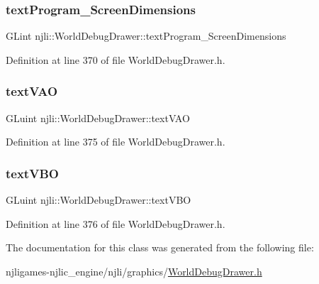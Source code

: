 \subsubsection{\texorpdfstring{text\+Program\+\_\+\+Screen\+Dimensions}{textProgram\_ScreenDimensions}}
{\footnotesize\ttfamily G\+Lint njli\+::\+World\+Debug\+Drawer\+::text\+Program\+\_\+\+Screen\+Dimensions\hspace{0.3cm}{\ttfamily [private]}}



Definition at line 370 of file World\+Debug\+Drawer.\+h.

\mbox{\label{classnjli_1_1_world_debug_drawer_a8a7f7e44c3a3ba9a1bca6c2d660f3a9d}} 
\subsubsection{\texorpdfstring{text\+V\+AO}{textVAO}}
{\footnotesize\ttfamily G\+Luint njli\+::\+World\+Debug\+Drawer\+::text\+V\+AO\hspace{0.3cm}{\ttfamily [private]}}



Definition at line 375 of file World\+Debug\+Drawer.\+h.

\mbox{\label{classnjli_1_1_world_debug_drawer_a1911a5f2cdd6f0b66480883d9880ba42}} 
\subsubsection{\texorpdfstring{text\+V\+BO}{textVBO}}
{\footnotesize\ttfamily G\+Luint njli\+::\+World\+Debug\+Drawer\+::text\+V\+BO\hspace{0.3cm}{\ttfamily [private]}}



Definition at line 376 of file World\+Debug\+Drawer.\+h.



The documentation for this class was generated from the following file\+:\begin{DoxyCompactItemize}
\item 
njligames-\/njlic\+\_\+engine/njli/graphics/\mbox{\hyperlink{_world_debug_drawer_8h}{World\+Debug\+Drawer.\+h}}\end{DoxyCompactItemize}
